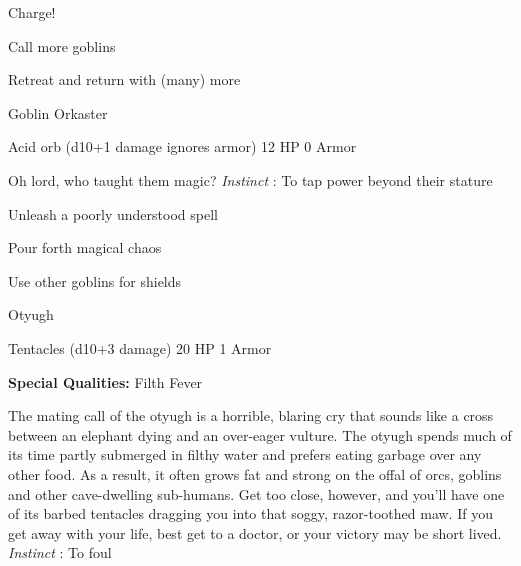 \startitemize[1,packed]
         
\item Charge!

         
\item Call more goblins

         
\item Retreat and return with (many) more

       
\stopitemize
       
\startMonsterName
Goblin Orkaster	 
\stopMonsterName
       

Acid orb (d10+1 damage ignores armor)	12 HP	0 Armor

       


       
\startMonsterDescription
Oh lord, who taught them magic? {\em Instinct} : To tap power beyond their stature
\stopMonsterDescription
       
\startitemize[1,packed]
         
\item Unleash a poorly understood spell

         
\item Pour forth magical chaos

         
\item Use other goblins for shields

       
\stopitemize
       
\startMonsterName
Otyugh	 
\stopMonsterName
       

Tentacles (d10+3 damage)	20 HP	1 Armor

       


       
\startMonsterQualities
         {\bf Special Qualities:}  Filth Fever
\stopMonsterQualities
       
\startMonsterDescription
The mating call of the otyugh is a horrible, blaring cry that sounds like a cross between an elephant dying and an over-eager vulture. The otyugh spends much of its time partly submerged in filthy water and prefers eating garbage over any other food. As a result, it often grows fat and strong on the offal of orcs, goblins and other cave-dwelling sub-humans. Get too close, however, and you’ll have one of its barbed tentacles dragging you into that soggy, razor-toothed maw. If you get away with your life, best get to a doctor, or your victory may be short lived. {\em Instinct} : To foul
\stopMonsterDescription
       
